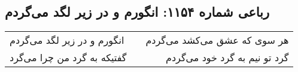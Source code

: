 \begin{center}
\section*{رباعی شماره ۱۱۵۴: انگورم و در زیر لگد می‌گردم}
\label{sec:1154}
\begin{longtable}{l p{0.5cm} r}
انگورم و در زیر لگد می‌گردم
&&
هر سوی که عشق می‌کشد می‌گردم
\\
گفتیکه به گرد من چرا می‌گرد
&&
گرد تو نیم به گرد خود می‌گردم
\\
\end{longtable}
\end{center}
